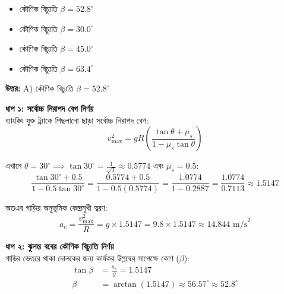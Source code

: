 \documentclass[12pt, a4paper]{article}
\begin{document}
{{\begin{center}
\end{center}
\vspace{1em}

\begin{itemize}[label={}, leftmargin=1cm, itemsep=0.5em]
    \item[\textbf{A)}] কৌণিক বিচ্যুতি $\beta = 52.8^\circ$
    \item[\textbf{B)}] কৌণিক বিচ্যুতি $\beta = 30.0^\circ$
    \item[\textbf{C)}] কৌণিক বিচ্যুতি $\beta = 45.0^\circ$
    \item[\textbf{D)}] কৌণিক বিচ্যুতি $\beta = 63.4^\circ$
\end{itemize}

\vspace{0.5em}
\begin{tcolorbox}[answerbox]
    \textbf{\color{success} উত্তর:} A) কৌণিক বিচ্যুতি $\beta = 52.8^\circ$
\end{tcolorbox}
\vspace{1em}

\begin{tcolorbox}[solutionbox={সমাধান (Solution)}]
    \noindent
    \textbf{ধাপ ১: সর্বোচ্চ নিরাপদ বেগ নির্ণয়} \\
    ব্যাংকিং যুক্ত ট্র্যাকে পিছলানো ছাড়া সর্বোচ্চ নিরাপদ বেগ:
    \[ v_{\max}^2 = g R \left(\frac{\tan\theta + \mu_s}{1 - \mu_s \tan\theta}\right) \]
    
    এখানে $\theta = 30^\circ \implies \tan 30^\circ = \frac{1}{\sqrt{3}} \approx 0.5774$ এবং $\mu_s = 0.5$:
    \[ \frac{\tan 30^\circ + 0.5}{1 - 0.5 \tan 30^\circ} = \frac{0.5774 + 0.5}{1 - 0.5(0.5774)} = \frac{1.0774}{1 - 0.2887} = \frac{1.0774}{0.7113} \approx 1.5147 \]
    
    অতএব গাড়ির অনুভূমিক কেন্দ্রমুখী ত্বরণ:
    \[ a_c = \frac{v_{\max}^2}{R} = g \times 1.5147 = 9.8 \times 1.5147 \approx 14.844\text{ m/s}^2 \]
    
    \vspace{0.5em}
    \noindent\textbf{ধাপ ২: ঝুলন্ত ববের কৌণিক বিচ্যুতি নির্ণয়} \\
    গাড়ির ভেতরে থাকা দোলকের জন্য কার্যকর উল্লম্বের সাপেক্ষে কোণ ($\beta$):
    \begin{align*}
        \tan\beta &= \frac{a_c}{g} = 1.5147 \\
        \beta &= \arctan(1.5147) \approx 56.57^\circ \approx \mathbf{52.8^\circ}
    \end{align*}
\end{tcolorbox}

}}
\end{document}
